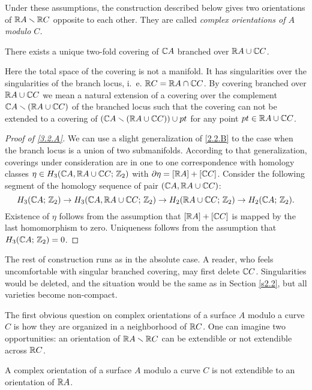 \documentclass{article}
\numberwithin{equation}{section}
\begin{document}
Under these assumptions, the construction described below gives two
orientations  of $\mathbb R A\smallsetminus\mathbb R C$ opposite to each other. They are
called {\it complex orientations of $A$ modulo $C$.\/}

\begin{lem}\label{3.2.A} There exists a unique two-fold covering of
$\mathbb C A$ branched over $\mathbb R A\cup\mathbb C C$.\end{lem}

Here the total space of the covering is not a manifold. It has
singularities over the singularities of the branch locus, i.~e. $\mathbb R
C=\mathbb R A\cap\mathbb C C$. By covering branched over $\mathbb R A\cup\mathbb C C$ we mean a
natural extension of a covering over the complement
$\mathbb C A\smallsetminus(\mathbb R A\cup\mathbb C C)$ of the branched locus such that the covering
can not be extended to a covering of $(\mathbb C A\smallsetminus(\mathbb R A\cup\mathbb C C))\cup pt$
for any point $pt\in\mathbb R A\cup\mathbb C C $.

\begin{proof}[Proof of \ref{3.2.A}] We can use a slight generalization of
\ref{2.2.B} to
the case when the branch locus is a union of two submanifolds.
According to that generalization, coverings under consideration are in
one to one correspondence with homology classes $\eta\in H_3(\mathbb C A,
\mathbb R A\cup\mathbb C C;\,\mathbb Z_2)$ with $\partial \eta=[\mathbb R A]+[\mathbb C C]$. Consider the
following segment of the homology sequence of pair $(\mathbb C A, \mathbb R A\cup\mathbb C
C)$:
$$
H_3(\mathbb C A;\,\mathbb Z_2)\to H_3(\mathbb C A, \mathbb R A\cup\mathbb C C;\,\mathbb Z_2)\to
H_2(\mathbb R A\cup\mathbb C C;\,\mathbb Z_2)\to H_2(\mathbb C A;\,\mathbb Z_2).
$$
Existence of $\eta$
follows from the assumption that $[\mathbb R A]+[\mathbb C C]$ is mapped by the last
homomorphism to zero. Uniqueness follows from the assumption that
$H_3(\mathbb C A;\,\mathbb Z_2)=0$.  %
\end{proof}

The rest of construction runs as in the absolute case. A reader, who
feels uncomfortable with singular branched covering, may first delete
$\mathbb C C$. Singularities would be deleted, and the situation would be
the same as in Section \ref{s2.2}, but all varieties become non-compact.

The first obvious question on complex orientations of a surface $A$
modulo a curve $C$ is how they are organized in a neighborhood of $\mathbb R
C$. One can imagine two opportunities: an orientation of $\mathbb R A \smallsetminus\mathbb R
C$ can be extendible or not extendible across $\mathbb R C$.

\begin{thm}\label{3.2.B} A complex orientation of a surface $A$ modulo a curve
$C$ is not extendible to an orientation of $\mathbb R A$.\end{thm}
\end{document}
